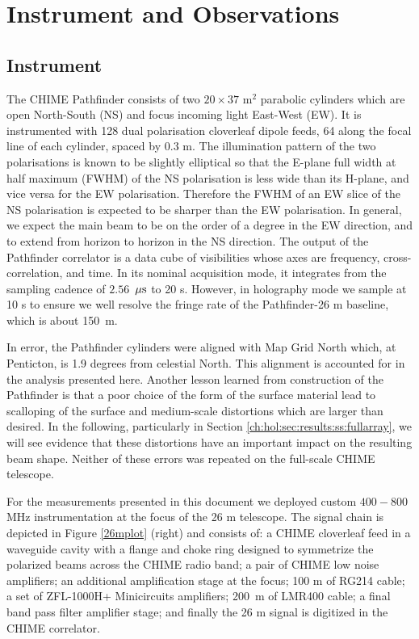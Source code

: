 \section{Instrument and Observations} \label{ch:hol:sec:io}

\subsection{Instrument} \label{ch:hol:sec:io:ss:i}

The CHIME Pathfinder\citep{chimepath1} consists of two $20\times37$ m$^2$ parabolic cylinders which are open North-South (NS) and focus incoming light East-West (EW). It is instrumented with 128 dual polarisation cloverleaf dipole feeds\citep{meiling}, 64 along the focal line of each cylinder, spaced by $0.3$ m. The illumination pattern of the two polarisations is known to be slightly elliptical so that the E-plane full width at half maximum (FWHM) of the NS polarisation is less wide than its H-plane, and vice versa for the EW polarisation. Therefore the FWHM of an EW slice of the NS polarisation is expected to be sharper than the EW polarisation. In general, we expect the main beam to be on the order of a degree in the EW direction, and to extend from horizon to horizon in the NS direction. The output of the Pathfinder correlator is a data cube of visibilities whose axes are frequency, cross-correlation, and time. In its nominal acquisition mode, it integrates from the sampling cadence of $2.56$~${\rm \mu s}$ to 20 s. However, in holography mode we sample at 10 s to ensure we well resolve the fringe rate of the Pathfinder-26 m baseline, which is about 150~m.

In error, the Pathfinder cylinders were aligned with Map Grid North which, at Penticton, is 1.9 degrees from celestial North. This alignment is accounted for in the analysis presented here. Another lesson learned from construction of the Pathfinder is that a poor choice of the form of the surface material lead to scalloping of the surface and medium-scale distortions which are larger than desired. In the following, particularly in Section \ref{ch:hol:sec:results:ss:fullarray}, we will see evidence that these distortions have an important impact on the resulting beam shape. Neither of these errors was repeated on the full-scale CHIME telescope.

For the measurements presented in this document we deployed custom $400-800$ MHz instrumentation at the focus of the 26 m telescope. The signal chain is depicted in Figure \ref{26mplot} (right) and consists of: a CHIME cloverleaf feed in a waveguide cavity with a flange and choke ring designed to symmetrize the polarized beams across the CHIME radio band; a pair of CHIME low noise amplifiers; an additional amplification stage at the focus; 100 m of RG214 cable; a set of ZFL-1000H+ Minicircuits amplifiers; 200~m of LMR400 cable; a final band pass filter amplifier stage; and finally the 26 m signal is digitized in the CHIME correlator.

